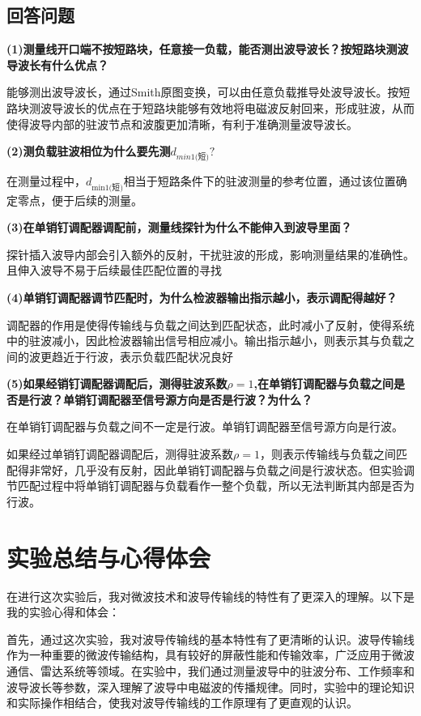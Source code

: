 \documentclass[12pt,hyperref,a4paper,UTF8]{ctexart}
\begin{document}
\subsection{回答问题}
\textbf{(1)测量线开口端不按短路块，任意接一负载，能否测出波导波长？按短路块测波导波长有什么优点？}

能够测出波导波长，通过Smith原图变换，可以由任意负载推导处波导波长。按短路块测波导波长的优点在于短路块能够有效地将电磁波反射回来，形成驻波，从而使得波导内部的驻波节点和波腹更加清晰，有利于准确测量波导波长。

\textbf{(2)测负载驻波相位为什么要先测$d_{min1\text{(短)}}?$}

在测量过程中，$d_{\text{min}1\text{(短)}}$相当于短路条件下的驻波测量的参考位置，通过该位置确定零点，便于后续的测量。

\textbf{(3)在单销钉调配器调配前，测量线探针为什么不能伸入到波导里面？}

探针插入波导内部会引入额外的反射，干扰驻波的形成，影响测量结果的准确性。且伸入波导不易于后续最佳匹配位置的寻找

\textbf{(4)单销钉调配器调节匹配时，为什么检波器输出指示越小，表示调配得越好？}

调配器的作用是使得传输线与负载之间达到匹配状态，此时减小了反射，使得系统中的驻波减小，因此检波器输出信号相应减小。输出指示越小，则表示其与负载之间的波更趋近于行波，表示负载匹配状况良好

\textbf{(5)如果经销钉调配器调配后，测得驻波系数$\rho=1$,在单销钉调配器与负载之间是否是行波？单销钉调配器至信号源方向是否是行波？为什么？}

在单销钉调配器与负载之间不一定是行波。单销钉调配器至信号源方向是行波。

如果经过单销钉调配器调配后，测得驻波系数$\rho=1$，则表示传输线与负载之间匹配得非常好，几乎没有反射，因此单销钉调配器与负载之间是行波状态。但实验调节匹配过程中将单销钉调配器与负载看作一整个负载，所以无法判断其内部是否为行波。

\section{实验总结与心得体会}

在进行这次实验后，我对微波技术和波导传输线的特性有了更深入的理解。以下是我的实验心得和体会：

首先，通过这次实验，我对波导传输线的基本特性有了更清晰的认识。波导传输线作为一种重要的微波传输结构，具有较好的屏蔽性能和传输效率，广泛应用于微波通信、雷达系统等领域。在实验中，我们通过测量波导中的驻波分布、工作频率和波导波长等参数，深入理解了波导中电磁波的传播规律。同时，实验中的理论知识和实际操作相结合，使我对波导传输线的工作原理有了更直观的认识。
\end{document}
